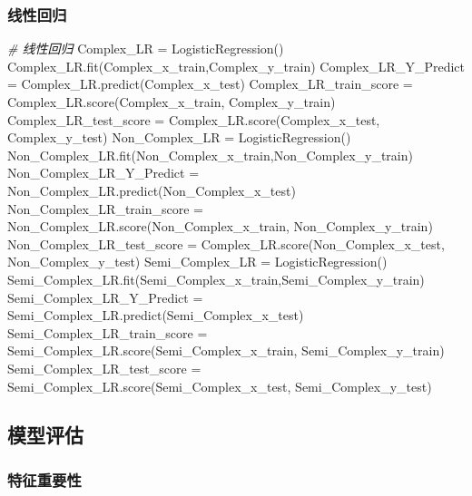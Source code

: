 \documentclass[
]{article}
\newenvironment{Shaded}{}{}
\newcommand{\CommentTok}[1]{\textcolor[rgb]{0.38,0.63,0.69}{\textit{#1}}}
\newcommand{\NormalTok}[1]{#1}
\newcommand{\OperatorTok}[1]{\textcolor[rgb]{0.40,0.40,0.40}{#1}}
\begin{document}
\hypertarget{header-n301}{%
\subsubsection{线性回归}\label{header-n301}}

\begin{Shaded}
\begin{Highlighting}[]
\CommentTok{\# 线性回归}
\NormalTok{Complex\_LR }\OperatorTok{=}\NormalTok{ LogisticRegression()}
\NormalTok{Complex\_LR.fit(Complex\_x\_train,Complex\_y\_train)}
\NormalTok{Complex\_LR\_Y\_Predict }\OperatorTok{=}\NormalTok{ Complex\_LR.predict(Complex\_x\_test)}
\NormalTok{Complex\_LR\_train\_score }\OperatorTok{=}\NormalTok{ Complex\_LR.score(Complex\_x\_train, Complex\_y\_train)}
\NormalTok{Complex\_LR\_test\_score }\OperatorTok{=}\NormalTok{ Complex\_LR.score(Complex\_x\_test, Complex\_y\_test)}
\NormalTok{Non\_Complex\_LR }\OperatorTok{=}\NormalTok{ LogisticRegression()}
\NormalTok{Non\_Complex\_LR.fit(Non\_Complex\_x\_train,Non\_Complex\_y\_train)}
\NormalTok{Non\_Complex\_LR\_Y\_Predict }\OperatorTok{=}\NormalTok{ Non\_Complex\_LR.predict(Non\_Complex\_x\_test)}
\NormalTok{Non\_Complex\_LR\_train\_score }\OperatorTok{=}\NormalTok{ Non\_Complex\_LR.score(Non\_Complex\_x\_train, Non\_Complex\_y\_train)}
\NormalTok{Non\_Complex\_LR\_test\_score }\OperatorTok{=}\NormalTok{ Complex\_LR.score(Non\_Complex\_x\_test, Non\_Complex\_y\_test)}
\NormalTok{Semi\_Complex\_LR }\OperatorTok{=}\NormalTok{ LogisticRegression()}
\NormalTok{Semi\_Complex\_LR.fit(Semi\_Complex\_x\_train,Semi\_Complex\_y\_train)}
\NormalTok{Semi\_Complex\_LR\_Y\_Predict }\OperatorTok{=}\NormalTok{ Semi\_Complex\_LR.predict(Semi\_Complex\_x\_test)}
\NormalTok{Semi\_Complex\_LR\_train\_score }\OperatorTok{=}\NormalTok{ Semi\_Complex\_LR.score(Semi\_Complex\_x\_train, Semi\_Complex\_y\_train)}
\NormalTok{Semi\_Complex\_LR\_test\_score }\OperatorTok{=}\NormalTok{ Semi\_Complex\_LR.score(Semi\_Complex\_x\_test, Semi\_Complex\_y\_test)}
\end{Highlighting}
\end{Shaded}

\hypertarget{header-n304}{%
\subsection{模型评估}\label{header-n304}}

\hypertarget{header-n305}{%
\subsubsection{特征重要性}\label{header-n305}}
\end{document}
